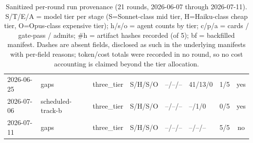 \documentclass[11pt]{article}
\begin{document}
\begin{table}[H]
\begin{tabularx}{\linewidth}{@{}lLllllcc@{}}
2026-06-25 & gaps & three\_tier & S/H/S/O & --/--/-- & 41/13/0 & 1/5 & yes \\
2026-07-06 & scheduled-track-b & three\_tier & S/H/S/O & --/--/-- & --/1/0 & 0/5 & yes \\
2026-07-11 & gaps & three\_tier & S/H/S/O & --/--/-- & --/--/-- & 5/5 & no \\
\bottomrule
\end{tabularx}
\caption{Sanitized per-round run provenance (21 rounds, 2026-06-07 through 2026-07-11). S/T/E/A = model tier per stage (S=Sonnet-class mid tier, H=Haiku-class cheap tier, O=Opus-class expensive tier); h/s/o = agent counts by tier; c/p/a = cards / gate-pass / admits; \#h = artifact hashes recorded (of 5); bf = backfilled manifest. Dashes are
absent fields, disclosed as such in the underlying manifests with per-field reasons; token/cost
totals were recorded in no round, so no cost accounting is claimed beyond the tier allocation.}
\label{tab:provenance}
\end{table}



\end{document}
